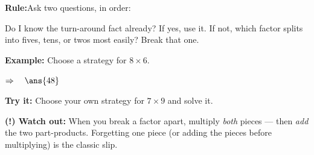 \documentclass[12pt]{article}
\begin{document}
\begin{formulabox}
\textbf{Rule:}\quad Ask two questions, in order:\par
Do I know the turn-around fact already? If yes, use it. If not, which factor splits into fives, tens, or twos most easily? Break that one.
\end{formulabox}

\begin{examplebox}
\textbf{Example:} Choose a strategy for $8 \times 6$.

$\Rightarrow\quad\ans{48}$
\end{examplebox}

\begin{tryitbox}
\textbf{Try it:} Choose your own strategy for $7 \times 9$ and solve it.\\[2pt]
\end{tryitbox}

\begin{watchoutbox}
\textbf{(!) Watch out:} When you break a factor apart, multiply \emph{both} pieces --- then \emph{add} the two part-products. Forgetting one piece (or adding the pieces before multiplying) is the classic slip.
\end{watchoutbox}
\end{document}
